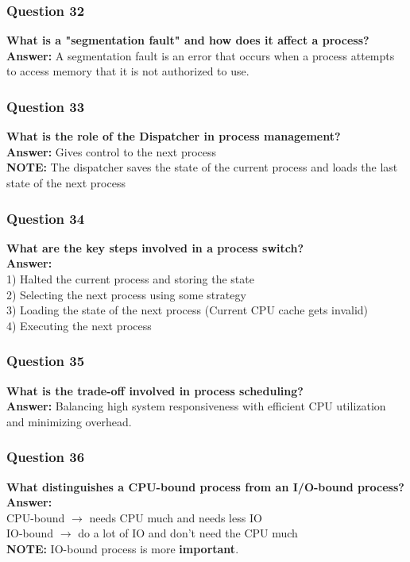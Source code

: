 \documentclass{article}
\begin{document}
\subsubsection*{Question 32}
\textbf{What is a "segmentation fault" and how does it affect a process?} \\
\textbf{Answer:} A segmentation fault is an error that occurs when a process attempts to access memory that it is not authorized to use.

\subsubsection*{Question 33}
\textbf{What is the role of the Dispatcher in process management?} \\
\textbf{Answer:} Gives control to the next process \\
\textbf{NOTE:} The dispatcher saves the state of the current process and loads the last state of the next process

\subsubsection*{Question 34}
\textbf{What are the key steps involved in a process switch?} \\
\textbf{Answer:} \\
1) Halted the current process and storing the state \\
2) Selecting the next process using some strategy \\
3) Loading the state of the next process (Current CPU cache gets invalid) \\
4) Executing the next process

\subsubsection*{Question 35}
\textbf{What is the trade-off involved in process scheduling?} \\
\textbf{Answer:} Balancing high system responsiveness with efficient CPU utilization and minimizing overhead.

\subsubsection*{Question 36}
\textbf{What distinguishes a CPU-bound process from an I/O-bound process?} \\
\textbf{Answer:} \\ 
CPU-bound $\rightarrow$ needs CPU much and needs less IO \\
IO-bound $\rightarrow$ do a lot of IO and don't need the CPU much \\
\textbf{NOTE:} IO-bound process is more \textbf{important}.
\end{document}
